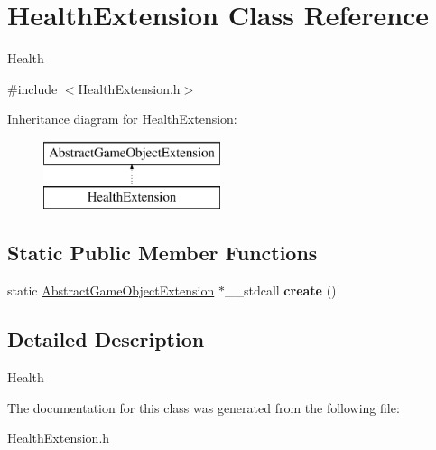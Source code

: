\hypertarget{class_health_extension}{}\section{Health\+Extension Class Reference}
\label{class_health_extension}


Health  




{\ttfamily \#include $<$Health\+Extension.\+h$>$}

Inheritance diagram for Health\+Extension\+:\begin{figure}[H]
\begin{center}
\leavevmode
\includegraphics[height=2.000000cm]{class_health_extension}
\end{center}
\end{figure}
\subsection*{Static Public Member Functions}
\begin{DoxyCompactItemize}
\item 
\mbox{\label{class_health_extension_a367da40b097a96a692e38ab3a22827b2}} 
static \mbox{\hyperlink{class_abstract_game_object_extension}{Abstract\+Game\+Object\+Extension}} $\ast$\+\_\+\+\_\+stdcall {\bfseries create} ()
\end{DoxyCompactItemize}


\subsection{Detailed Description}
Health 



The documentation for this class was generated from the following file\+:\begin{DoxyCompactItemize}
\item 
Health\+Extension.\+h\end{DoxyCompactItemize}
